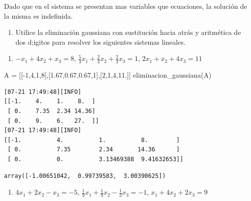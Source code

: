 \documentclass[
  letterpaper,
  DIV=11,
  numbers=noendperiod]{scrartcl}
\newenvironment{Shaded}{\begin{snugshade}}{\end{snugshade}}
\newcommand{\DecValTok}[1]{\textcolor[rgb]{0.68,0.00,0.00}{#1}}
\newcommand{\FloatTok}[1]{\textcolor[rgb]{0.68,0.00,0.00}{#1}}
\newcommand{\NormalTok}[1]{\textcolor[rgb]{0.00,0.23,0.31}{#1}}
\newcommand{\OperatorTok}[1]{\textcolor[rgb]{0.37,0.37,0.37}{#1}}
\providecommand{\tightlist}{%
  \setlength{\itemsep}{0pt}\setlength{\parskip}{0pt}}\usepackage{longtable,booktabs,array}
\begin{document}
Dado que en el sistema se presentan mas variables que ecuaciones, la
solución de la misma es indefinida.

\begin{enumerate}
\def\labelenumi{\arabic{enumi}.}
\setcounter{enumi}{1}
\tightlist
\item
  Utilice la eliminación gaussiana con sustitución hacia atrás y
  aritmética de dos d;igitos para resolver los siguientes sistemas
  lineales.
\end{enumerate}

\begin{enumerate}
\def\labelenumi{\alph{enumi}.}
\tightlist
\item
  \(-x_1 + 4x_2 + x_3 = 8\),
  \(\frac{5}{3}x_1 + \frac{2}{3}x_2 +\frac{2}{3}x_3 = 1\),
  \(2x_1 + x_2 +4x_3 = 11\)
\end{enumerate}

\begin{Shaded}
\begin{Highlighting}[]
\NormalTok{A }\OperatorTok{=}\NormalTok{ [[}\OperatorTok{{-}}\DecValTok{1}\NormalTok{,}\DecValTok{4}\NormalTok{,}\DecValTok{1}\NormalTok{,}\DecValTok{8}\NormalTok{],[}\FloatTok{1.67}\NormalTok{,}\FloatTok{0.67}\NormalTok{,}\FloatTok{0.67}\NormalTok{,}\DecValTok{1}\NormalTok{],[}\DecValTok{2}\NormalTok{,}\DecValTok{1}\NormalTok{,}\DecValTok{4}\NormalTok{,}\FloatTok{11.}\NormalTok{]]}
\NormalTok{eliminacion\_gaussiana(A)}
\end{Highlighting}
\end{Shaded}

\begin{verbatim}
[07-21 17:49:48][INFO] 
[[-1.    4.    1.    8.  ]
 [ 0.    7.35  2.34 14.36]
 [ 0.    9.    6.   27.  ]]
[07-21 17:49:48][INFO] 
[[-1.          4.          1.          8.        ]
 [ 0.          7.35        2.34       14.36      ]
 [ 0.          0.          3.13469388  9.41632653]]
\end{verbatim}

\begin{verbatim}
array([-1.00651042,  0.99739583,  3.00390625])
\end{verbatim}

\begin{enumerate}
\def\labelenumi{\alph{enumi}.}
\setcounter{enumi}{1}
\tightlist
\item
  \(4x_1 + 2x_2 - x_3 = -5\),
  \(\frac{1}{9}x_1 + \frac{1}{9}x_2 -\frac{1}{3}x_3 = -1\),
  \(x_1 + 4x_2 +2x_3 = 9\)
\end{enumerate}
\end{document}
